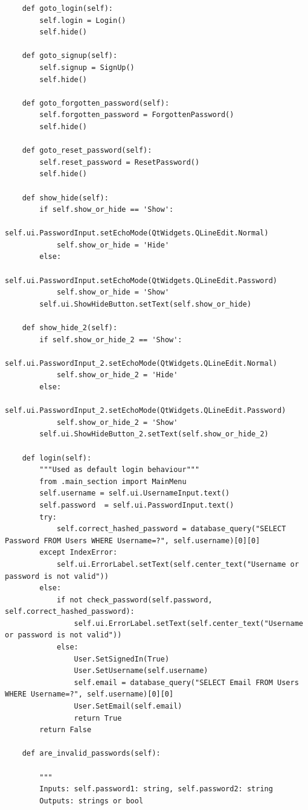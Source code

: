 \documentclass[12pt]{article}
\begin{document}
\begin{lstlisting}
    def goto_login(self):
        self.login = Login()
        self.hide()

    def goto_signup(self):
        self.signup = SignUp()
        self.hide()

    def goto_forgotten_password(self):
        self.forgotten_password = ForgottenPassword()
        self.hide()

    def goto_reset_password(self):
        self.reset_password = ResetPassword()
        self.hide()

    def show_hide(self):
        if self.show_or_hide == 'Show':
            self.ui.PasswordInput.setEchoMode(QtWidgets.QLineEdit.Normal)
            self.show_or_hide = 'Hide'
        else:
            self.ui.PasswordInput.setEchoMode(QtWidgets.QLineEdit.Password)
            self.show_or_hide = 'Show'
        self.ui.ShowHideButton.setText(self.show_or_hide)

    def show_hide_2(self):
        if self.show_or_hide_2 == 'Show':
            self.ui.PasswordInput_2.setEchoMode(QtWidgets.QLineEdit.Normal)
            self.show_or_hide_2 = 'Hide'
        else:
            self.ui.PasswordInput_2.setEchoMode(QtWidgets.QLineEdit.Password)
            self.show_or_hide_2 = 'Show'
        self.ui.ShowHideButton_2.setText(self.show_or_hide_2)

    def login(self):
        """Used as default login behaviour"""
        from .main_section import MainMenu
        self.username = self.ui.UsernameInput.text()
        self.password  = self.ui.PasswordInput.text()
        try:
            self.correct_hashed_password = database_query("SELECT Password FROM Users WHERE Username=?", self.username)[0][0]
        except IndexError:
            self.ui.ErrorLabel.setText(self.center_text("Username or password is not valid"))
        else:
            if not check_password(self.password, self.correct_hashed_password):
                self.ui.ErrorLabel.setText(self.center_text("Username or password is not valid"))
            else:
                User.SetSignedIn(True)
                User.SetUsername(self.username)
                self.email = database_query("SELECT Email FROM Users WHERE Username=?", self.username)[0][0]
                User.SetEmail(self.email)
                return True
        return False

    def are_invalid_passwords(self):

        """
        Inputs: self.password1: string, self.password2: string
        Outputs: strings or bool


\end{lstlisting}
\end{document}
